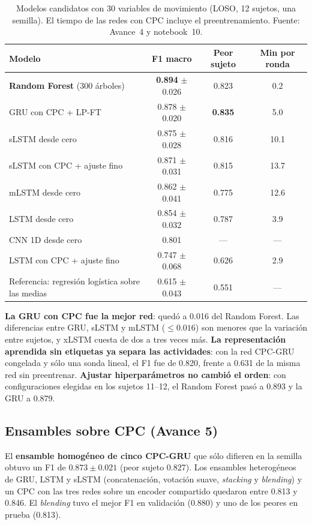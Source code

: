 \documentclass[letterpaper,11pt]{article}
\begin{document}
\begin{table}[H]
  \centering
  \small
  \caption{Modelos candidatos con 30 variables de movimiento (LOSO, 12 sujetos, una semilla). El tiempo de las redes con CPC incluye el preentrenamiento. Fuente: Avance~4 y notebook~10.}
  \label{tab:candidatos}
  \begin{tabular}{lccc}
    \toprule
    Modelo & F1 macro & Peor sujeto & Min por ronda \\
    \midrule
    \textbf{Random Forest} (300 árboles)  & \textbf{0.894} $\pm$ 0.026 & 0.823 & 0.2 \\
    GRU con CPC + LP-FT                   & 0.878 $\pm$ 0.020 & \textbf{0.835} & 5.0 \\
    sLSTM desde cero                      & 0.875 $\pm$ 0.028 & 0.816 & 10.1 \\
    sLSTM con CPC + ajuste fino           & 0.871 $\pm$ 0.031 & 0.815 & 13.7 \\
    mLSTM desde cero                      & 0.862 $\pm$ 0.041 & 0.775 & 12.6 \\
    LSTM desde cero                       & 0.854 $\pm$ 0.032 & 0.787 & 3.9 \\
    CNN 1D desde cero                     & 0.801 & --- & --- \\
    LSTM con CPC + ajuste fino            & 0.747 $\pm$ 0.068 & 0.626 & 2.9 \\
    Referencia: regresión logística sobre las medias & 0.615 $\pm$ 0.043 & 0.551 & --- \\
    \bottomrule
  \end{tabular}
\end{table}

\textbf{La GRU con CPC fue la mejor red}: quedó a 0.016 del Random Forest. Las diferencias entre GRU, sLSTM y mLSTM ($\le 0.016$) son menores que la variación entre sujetos, y xLSTM cuesta de dos a tres veces más. \textbf{La representación aprendida sin etiquetas ya separa las actividades}: con la red CPC-GRU congelada y sólo una sonda lineal, el F1 fue de 0.820, frente a 0.631 de la misma red sin preentrenar. \textbf{Ajustar hiperparámetros no cambió el orden}: con configuraciones elegidas en los sujetos 11--12, el Random Forest pasó a 0.893 y la GRU a 0.879.

\subsection{Ensambles sobre CPC (Avance 5)}
El \textbf{ensamble homogéneo de cinco CPC-GRU} que sólo difieren en la semilla obtuvo un F1 de $0.873 \pm 0.021$ (peor sujeto 0.827). Los ensambles heterogéneos de GRU, LSTM y sLSTM (concatenación, votación suave, \emph{stacking} y \emph{blending}) y un CPC con las tres redes sobre un encoder compartido quedaron entre 0.813 y 0.846. El \emph{blending} tuvo el mejor F1 en validación (0.880) y uno de los peores en prueba (0.813).
\end{document}
